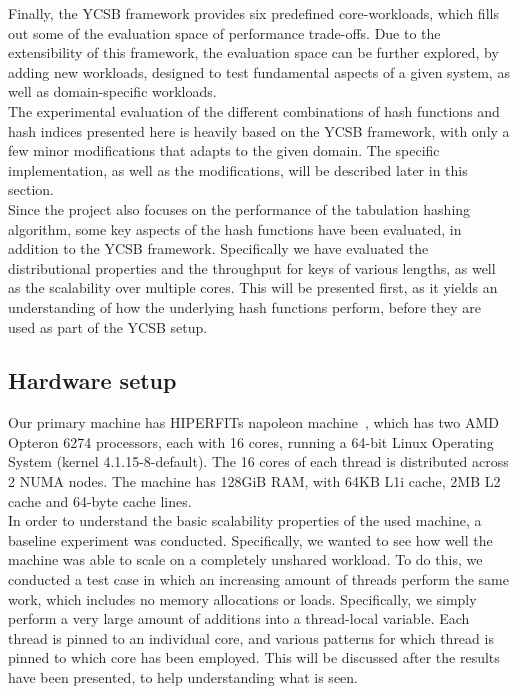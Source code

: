 \documentclass[11pt]{article} %
\begin{document}
Finally, the YCSB framework provides six predefined core-workloads, which fills out some of the evaluation space of performance trade-offs. Due to the extensibility of this framework, the evaluation space can be further explored, by adding new workloads, designed to test fundamental aspects of a given system, as well as domain-specific workloads.\\

The experimental evaluation of the different combinations of hash functions and hash indices presented here is heavily based on the YCSB framework, with only a few minor modifications that adapts to the given domain. The specific implementation, as well as the modifications, will be described later in this section. \\

Since the project also focuses on the performance of the tabulation hashing algorithm, some key aspects of the hash functions have been evaluated, in addition to the YCSB framework. Specifically we have evaluated the distributional properties and the throughput for keys of various lengths, as well as the scalability over multiple cores. This will be presented first, as it yields an understanding of how the underlying hash functions perform, before they are used as part of the YCSB setup.\\

\subsection{Hardware setup}
\label{subsec:hardware}
Our primary machine has HIPERFITs napoleon machine~\cite{nphf}, which has two AMD Opteron 6274 processors, each with 16 cores, running a 64-bit Linux Operating System (kernel 4.1.15-8-default). The 16 cores of each thread is distributed across 2 NUMA nodes. The machine has 128GiB RAM, with 64KB L1i cache, 2MB L2 cache and 64-byte cache lines. \\

In order to understand the basic scalability properties of the used machine, a baseline experiment was conducted. Specifically, we wanted to see how well the machine was able to scale on a completely unshared workload. To do this, we conducted a test case in which an increasing amount of threads perform the same work, which includes no memory allocations or loads. Specifically, we simply perform a very large amount of additions into a thread-local variable. Each thread is pinned to an individual core, and various patterns for which thread is pinned to which core has been employed. This will be discussed after the results have been presented, to help understanding what is seen.\\
\end{document}
